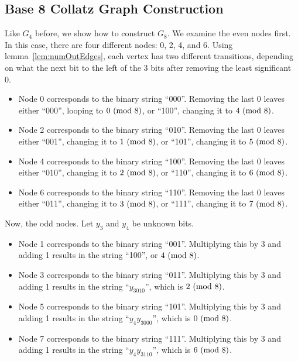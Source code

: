 \subsection{Base 8 Collatz Graph Construction} \label{subsubsec:base8proof}
Like $G_4$ before, we show how to construct $G_8$. We examine the even nodes first. In this case, there are four different nodes: 0, 2, 4, and 6. Using lemma~\ref{lem:numOutEdges}, each vertex has two different transitions, depending on what the next bit to the left of the 3 bits after removing the least significant 0. 
\begin{itemize}
    \item Node 0 corresponds to the binary string ``000''. Removing the last 0 leaves either ``000'', looping to $0\ (\mathrm{mod}\ 8)$, or ``100'', changing it to $4\ (\mathrm{mod}\ 8)$.
    \item Node 2 corresponds to the binary string ``010''. Removing the last 0 leaves either ``001'', changing it to $1\ (\mathrm{mod}\ 8)$, or ``101'', changing it to $5\ (\mathrm{mod}\ 8)$.
    \item Node 4 corresponds to the binary string ``100''. Removing the last 0 leaves either ``010'', changing it to $2\ (\mathrm{mod}\ 8)$, or ``110'', changing it to $6\ (\mathrm{mod}\ 8)$.
    \item Node 6 corresponds to the binary string ``110''. Removing the last 0 leaves either ``011'', changing it to $3\ (\mathrm{mod}\ 8)$, or ``111'', changing it to $7\ (\mathrm{mod}\ 8)$.
\end{itemize}
Now, the odd nodes. Let $y_3$ and $y_4$ be unknown bits.
\begin{itemize}
    \item Node 1 corresponds to the binary string ``001''. Multiplying this by 3 and adding 1 results in the string ``100'', or $4\ (\mathrm{mod}\ 8)$.
    \item Node 3 corresponds to the binary string ``011''. Multiplying this by 3 and adding 1 results in the string ``$y_3010$'', which is $2\ (\mathrm{mod}\ 8)$.
    \item Node 5 corresponds to the binary string ``101''. Multiplying this by 3 and adding 1 results in the string ``$y_4y_3000$'', which is $0\ (\mathrm{mod}\ 8)$.
    \item Node 7 corresponds to the binary string ``111''. Multiplying this by 3 and adding 1 results in the string ``$y_4y_3110$'', which is $6\ (\mathrm{mod}\ 8)$.
\end{itemize}
